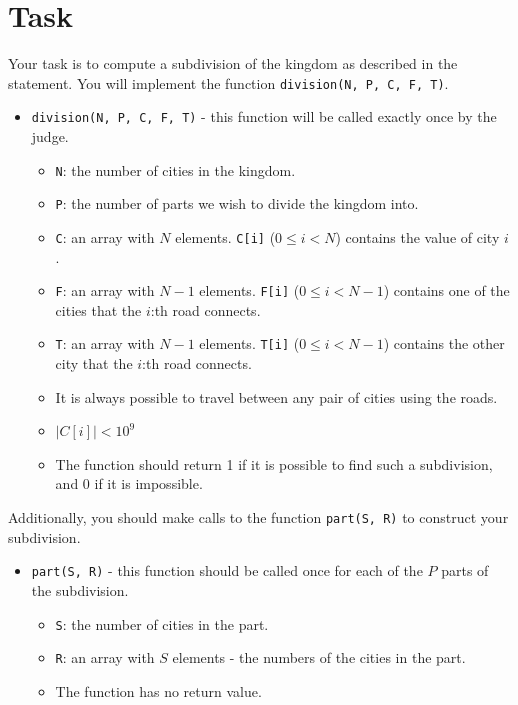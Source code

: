 \section*{Task}
Your task is to compute a subdivision of the kingdom as described in the statement. You will implement the function \texttt{division(N, P, C, F, T)}.

\begin{itemize}
  \item \texttt{division(N, P, C, F, T)} - this function will be called exactly once by the judge.
  \begin{itemize}
    \item \texttt{N}: the number of cities in the kingdom.
    \item \texttt{P}: the number of parts we wish to divide the kingdom into.
    \item \texttt{C}: an array with $N$ elements. \texttt{C[i]} ($0 \le i < N$) contains the value of city $i$.
    \item \texttt{F}: an array with $N - 1$ elements. \texttt{F[i]} ($0 \le i < N - 1$) contains one of the cities that the $i$:th road connects.
    \item \texttt{T}: an array with $N - 1$ elements. \texttt{T[i]} ($0 \le i < N - 1$) contains the other city that the $i$:th road connects.
    \item It is always possible to travel between any pair of cities using the roads.
		\item $|C[i]| < 10^9$
		\item The function should return 1 if it is possible to find such a subdivision,
			and 0 if it is impossible.
  \end{itemize}
\end{itemize}

Additionally, you should make calls to the function \texttt{part(S, R)} to construct your subdivision.
\begin{itemize}
  \item \texttt{part(S, R)} - this function should be called once for each of the $P$ parts of the subdivision.
  \begin{itemize}
    \item \texttt{S}: the number of cities in the part.
    \item \texttt{R}: an array with $S$ elements - the numbers of the cities in the part.
		\item The function has no return value.
  \end{itemize}
\end{itemize}

